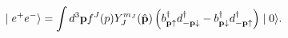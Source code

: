 \begin{equation}
\mid e^{+}e^{-}\rangle =\int d^{3}\mathbf{p}f^{J}(p)Y_{J}^{m_{J}}(\hat{%
\mathbf{p}})\left( b_{\mathbf{p}\uparrow }^{\dagger }d_{-\mathbf{p}%
\downarrow }^{\dagger }-b_{\mathbf{p}\downarrow }^{\dagger }d_{-\mathbf{p}%
\uparrow }^{\dagger }\right) \mid 0\rangle .
\end{equation}

